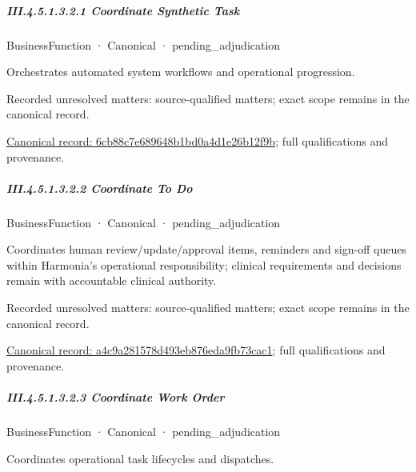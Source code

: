 \subparagraph*{III.4.5.1.3.2.1 Coordinate Synthetic Task}
\label{navigation:III.4.5.1.3.2.1}

\label{element:6cb88c7e689648b1bd0a4d1e26b12f9b}
{\small BusinessFunction · Canonical · pending\_adjudication}\par

Orchestrates automated system workflows and operational progression.


{\small Recorded unresolved matters: source-qualified matters; exact scope remains in the canonical record.}\par
{\footnotesize \href{../../../../../../../continuum/business/business-function/6cb88c7e689648b1bd0a4d1e26b12f9b.md}{Canonical record: 6cb88c7e689648b1bd0a4d1e26b12f9b}; full qualifications and provenance.}\par
\subparagraph*{III.4.5.1.3.2.2 Coordinate To Do}
\label{navigation:III.4.5.1.3.2.2}

\label{element:a4c9a281578d493eb876eda9fb73cac1}
{\small BusinessFunction · Canonical · pending\_adjudication}\par

Coordinates human review/update/approval items, reminders and sign-off queues within Harmonia's operational responsibility; clinical requirements and decisions remain with accountable clinical authority.


{\small Recorded unresolved matters: source-qualified matters; exact scope remains in the canonical record.}\par
{\footnotesize \href{../../../../../../../continuum/business/business-function/a4c9a281578d493eb876eda9fb73cac1.md}{Canonical record: a4c9a281578d493eb876eda9fb73cac1}; full qualifications and provenance.}\par
\subparagraph*{III.4.5.1.3.2.3 Coordinate Work Order}
\label{navigation:III.4.5.1.3.2.3}

\label{element:0161308bad6945b5bcfdeea5519341cd}
{\small BusinessFunction · Canonical · pending\_adjudication}\par

Coordinates operational task lifecycles and dispatches.


